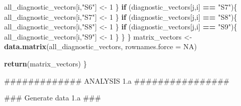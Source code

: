 \documentclass[]{article}
\newenvironment{Shaded}{\begin{snugshade}}{\end{snugshade}}
\newcommand{\KeywordTok}[1]{\textcolor[rgb]{0.13,0.29,0.53}{\textbf{#1}}}
\newcommand{\DataTypeTok}[1]{\textcolor[rgb]{0.13,0.29,0.53}{#1}}
\newcommand{\DecValTok}[1]{\textcolor[rgb]{0.00,0.00,0.81}{#1}}
\newcommand{\StringTok}[1]{\textcolor[rgb]{0.31,0.60,0.02}{#1}}
\newcommand{\OtherTok}[1]{\textcolor[rgb]{0.56,0.35,0.01}{#1}}
\newcommand{\ControlFlowTok}[1]{\textcolor[rgb]{0.13,0.29,0.53}{\textbf{#1}}}
\newcommand{\OperatorTok}[1]{\textcolor[rgb]{0.81,0.36,0.00}{\textbf{#1}}}
\newcommand{\AlertTok}[1]{\textcolor[rgb]{0.94,0.16,0.16}{#1}}
\newcommand{\NormalTok}[1]{#1}
\begin{document}
\begin{Shaded}
\begin{Highlighting}[]
{{{{{{{{{{\NormalTok{        all_diagnostic_vectors[i,}\StringTok{"S6"}\NormalTok{] <-}\StringTok{ }\DecValTok{1}
\NormalTok{      \}}
      \ControlFlowTok{if}\NormalTok{ (diagnostic_vectors[j,i] }\OperatorTok{==}\StringTok{ "S7"}\NormalTok{)\{}
\NormalTok{        all_diagnostic_vectors[i,}\StringTok{"S7"}\NormalTok{] <-}\StringTok{ }\DecValTok{1}
\NormalTok{      \}}
      \ControlFlowTok{if}\NormalTok{ (diagnostic_vectors[j,i] }\OperatorTok{==}\StringTok{ "S8"}\NormalTok{)\{}
\NormalTok{        all_diagnostic_vectors[i,}\StringTok{"S8"}\NormalTok{] <-}\StringTok{ }\DecValTok{1}
\NormalTok{      \}}
      \ControlFlowTok{if}\NormalTok{ (diagnostic_vectors[j,i] }\OperatorTok{==}\StringTok{ "S9"}\NormalTok{)\{}
\NormalTok{        all_diagnostic_vectors[i,}\StringTok{"S9"}\NormalTok{] <-}\StringTok{ }\DecValTok{1}
\NormalTok{      \}}
\NormalTok{    \}    }
\NormalTok{  \}}
\NormalTok{  matrix_vectors <-}\StringTok{ }\KeywordTok{data.matrix}\NormalTok{(all_diagnostic_vectors, }\DataTypeTok{rownames.force =} \OtherTok{NA}\NormalTok{)}

  \KeywordTok{return}\NormalTok{(matrix_vectors)}
\NormalTok{\}}



\NormalTok{############# ANALYSIS 1.a ################}

\NormalTok{### Generate data 1.a }\AlertTok{###}

}}}}}}}}}}
\end{Highlighting}
\end{Shaded}
\end{document}
